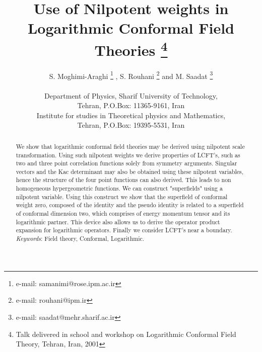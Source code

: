 \documentclass[a4paper,11pt]{article}
\begin{document}
\title{Use of Nilpotent weights in Logarithmic Conformal Field Theories \footnote{
Talk delivered in school and workshop on Logarithmic Conformal
Field Theory, Tehran, Iran, 2001}}
\author{S. Moghimi-Araghi \footnote{e-mail: samanimi@rose.ipm.ac.ir} ,
S. Rouhani \footnote{e-mail: rouhani@ipm.ir} and M.
Saadat \footnote{e-mail: saadat@mehr.sharif.ac.ir}\\
\\
Department of Physics, Sharif University of Technology,\\ Tehran,
P.O.Box: 11365-9161, Iran\\ Institute for studies in Theoretical
physics and Mathematics,\\ Tehran, P.O.Box: 19395-5531, Iran}
\date{}
\maketitle
\begin{abstract}
We show that logarithmic conformal field theories may be derived
using nilpotent scale transformation. Using such nilpotent weights
we derive properties of LCFT's, such as two and three point
correlation functions solely from symmetry arguments. Singular
vectors and the Kac determinant may also be obtained using these
nilpotent variables, hence the structure of the four point
functions can also derived. This leads to non homogeneous
hypergeometric functions. We can construct "superfields" using a
nilpotent variable. Using this construct we show that the
superfield of conformal weight zero, composed of the identity and
the pseudo identity is related to a superfield of conformal
dimension two, which comprises of energy momentum tensor and its
logarithmic partner. This device also allows us to derive the
operator product expansion for logarithmic operators. Finally we
consider LCFT's near a boundary.
\\

{\it Keywords}: Field theory, Conformal, Logarithmic.
\end{abstract}
\end{document}
